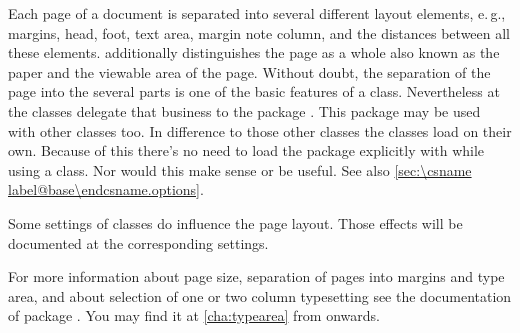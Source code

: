 Each page of a document is separated into several different layout elements,
e.\,g., margins, head, foot, text area, margin note column, and the distances
between all these elements. \KOMAScript{} additionally distinguishes the page
as a whole also known as the paper and the viewable area of the page. Without
doubt, the separation of the page into the several parts is one of the basic
features of a class. Nevertheless at \KOMAScript{} the classes delegate that
business to the package . This package may be used with other
classes too. In difference to those other classes the \KOMAScript{} classes
load  on their own. Because of this there's no need to load
the package explicitly with  while using a \KOMAScript{}
class. Nor would this make sense or be useful. See also 
\autoref{sec:\csname label@base\endcsname.options}.

Some settings of \KOMAScript{} classes do influence the page layout. Those
effects will be documented at the corresponding settings.

For more information about page size, separation of pages into margins and
type area, and about selection of one or two column typesetting see the
documentation of package . You may find it at
\autoref{cha:typearea} from  onwards.

